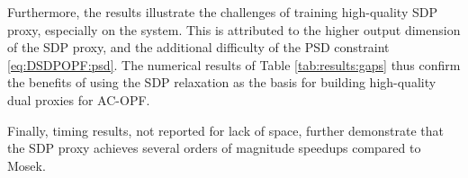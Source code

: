 Furthermore, the results illustrate the challenges of training high-quality SDP proxy, especially on the {\ieeeXXS} system.
This is attributed to the higher output dimension of the SDP proxy, and the additional difficulty of the PSD constraint \eqref{eq:DSDPOPF:psd}.
The numerical results of Table \ref{tab:results:gaps} thus confirm the benefits of using the SDP relaxation as the basis for building high-quality dual proxies for AC-OPF.

Finally, timing results, not reported for lack of space, further demonstrate that the SDP proxy achieves several orders of magnitude speedups compared to Mosek.